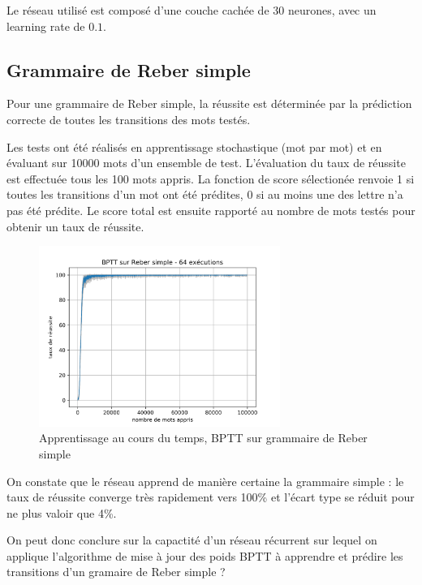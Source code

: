 Le réseau utilisé est composé d'une couche cachée de 30 neurones, avec un learning
rate de $0.1$.

\subsection{Grammaire de Reber simple}
Pour une grammaire de Reber simple, la réussite est déterminée par la prédiction
correcte de toutes les transitions des mots testés.

\medskip

Les tests ont été réalisés en apprentissage stochastique (mot par mot) et en
évaluant sur 10000 mots d'un ensemble de test. L'évaluation du taux de réussite
est effectuée tous les 100 mots appris. La fonction de score sélectionée renvoie
1 si toutes les transitions d'un mot ont été prédites, 0 si au moins une des
lettre n'a pas été prédite. Le score total est ensuite rapporté au nombre de
mots testés pour obtenir un taux de réussite.


\begin{figure}[!ht]
\begin{center}
\includegraphics[width=0.7\textwidth]{images/results/bptt_simplereber_ls30_lr01.png}
\caption{Apprentissage au cours du temps, BPTT sur grammaire de Reber simple}
\end{center}
\end{figure}

\medskip

On constate que le réseau apprend de manière certaine la grammaire simple : 
le taux de réussite converge très rapidement vers 100\% et l'écart type
se réduit pour ne plus valoir que 4\%.

\medskip

On peut donc conclure sur la capactité d'un réseau récurrent sur lequel on
applique l'algorithme de mise à jour des poids BPTT à apprendre et prédire les
transitions d'un gramaire de Reber simple ?

